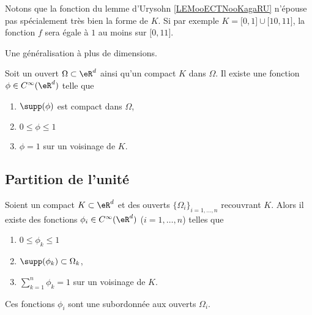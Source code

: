 \begin{normaltext}
	Notons que la fonction du lemme d'Urysohn \ref{LEMooECTNooKagaRU} n'épouse pas spécialement très bien la forme de \( K\). Si par exemple \( K=\mathopen[ 0 , 1 \mathclose]\cup \mathopen[ 10 , 11 \mathclose]\), la fonction \( f\) sera égale à \( 1\) au moins sur \( \mathopen[ 0 , 11 \mathclose]\).
\end{normaltext}

Une généralisation à plus de dimensions.

\begin{proposition}       \label{PROPooBOZIooAhKbPs}
	Soit un ouvert \( \Omega\subset \eR^d\) ainsi qu'un compact \( K\) dans \( \Omega\). Il existe une fonction \( \phi\in C^{\infty}(\eR^d)\) telle que
	\begin{enumerate}
		\item
		      \( \supp(\phi)\) est compact dans \( \Omega\),
		\item
		      \( 0\leq \phi\leq 1\)
		\item
		      \( \phi=1\) sur un voisinage de \( K\).
	\end{enumerate}
\end{proposition}

\subsection{Partition de l'unité}

\begin{theorem}       \label{THOooQFCQooSlgLpz}
	Soient un compact \( K\subset \eR^d\) et des ouverts \( \{ \Omega_i \}_{i=1,\ldots, n}\) recouvrant \( K\). Alors il existe des fonctions \( \phi_i\in  C^{\infty}(\eR^d)\) (\( i=1,\ldots, n\)) telles que
	\begin{enumerate}
		\item
		      \( 0\leq \phi_k\leq 1\)
		\item
		      \( \supp(\phi_k)\subset \Omega_k\),
		\item
		      \( \sum_{k=1}^n\phi_k=1\) sur un voisinage de \( K\).
	\end{enumerate}
	Ces fonctions \( \phi_i\) sont une  subordonnée aux ouverts \( \Omega_i\).
\end{theorem}

